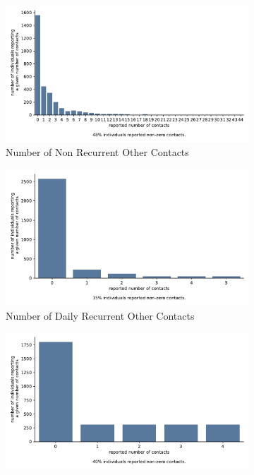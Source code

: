\begin{figure}
    \centering
    \begin{subfigure}[b]{0.3\textwidth}
        \centering
        \includegraphics[width=\textwidth]{figures/results/figures/data/distributions_of_the_number_of_contacts/other_non_recurrent}
        \caption{Number of Non Recurrent Other Contacts}
        \label{n_contacts_other_non_recurrent}
    \end{subfigure}
    \hfill
    \begin{subfigure}[b]{0.3\textwidth}
        \centering
        \includegraphics[width=\textwidth]{figures/results/figures/data/distributions_of_the_number_of_contacts/other_recurrent_daily}
        \caption{Number of Daily Recurrent Other Contacts}
        \label{n_contacts_other_daily_recurrent}
    \end{subfigure}
    \hfill
    \begin{subfigure}[b]{0.3\textwidth}
        \centering
        \includegraphics[width=\textwidth]{figures/results/figures/data/distributions_of_the_number_of_contacts/other_recurrent_weekly}

\end{subfigure}
\end{figure}
